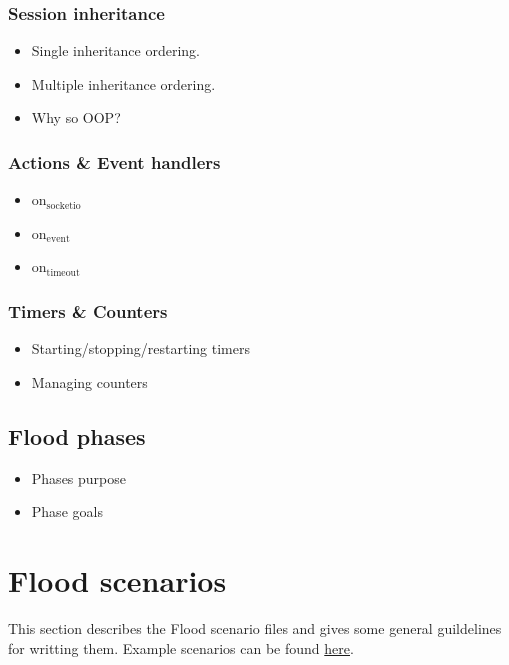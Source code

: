 \documentclass[a4paper]{article}
\begin{document}
\subsubsection{Session inheritance}
\label{sec-2-2-2}


\begin{itemize}
\item Single inheritance ordering.
\item Multiple inheritance ordering.
\item Why so OOP?
\end{itemize}
\subsubsection{Actions \& Event handlers}
\label{sec-2-2-3}


\begin{itemize}
\item on$_{\mathrm{socketio}}$
\item on$_{\mathrm{event}}$
\item on$_{\mathrm{timeout}}$
\end{itemize}
\subsubsection{Timers \& Counters}
\label{sec-2-2-4}


\begin{itemize}
\item Starting/stopping/restarting timers
\item Managing counters
\end{itemize}
\subsection{Flood phases}
\label{sec-2-3}
\label{ref-goals}



\begin{itemize}
\item Phases purpose
\item Phase goals
\end{itemize}

\pagebreak
\section{Flood scenarios}
\label{sec-3}

This section describes the Flood scenario files and gives some general guildelines for writting them. Example scenarios can be found \hyperref[sec-3-7]{here}.
\end{document}

